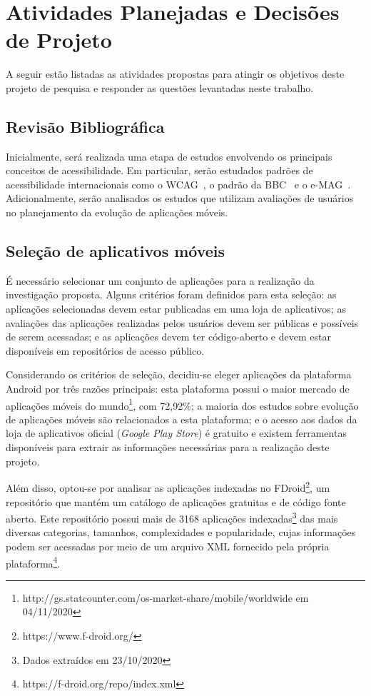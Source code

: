 \section{Atividades Planejadas e Decisões de Projeto}
\label{sec:atividadesgerais}

A seguir estão listadas as atividades propostas para atingir os objetivos deste projeto de pesquisa e responder as questões levantadas neste trabalho.

\subsection{Revisão Bibliográfica}

Inicialmente, será realizada uma etapa de estudos envolvendo os principais conceitos de acessibilidade. Em particular, serão estudados padrões de acessibilidade internacionais como o WCAG~\cite{wcag}, o padrão da BBC~\cite{bbc} e o e-MAG~\cite{emag}. Adicionalmente, serão analisados os estudos que utilizam avaliações de usuários no planejamento da evolução de aplicações móveis.

\subsection{Seleção de aplicativos móveis}
\label{sec:selecaoapps}

É necessário selecionar um conjunto de aplicações para a realização da investigação proposta. Alguns critérios foram definidos para esta seleção: as aplicações selecionadas devem estar publicadas em uma loja de aplicativos; as avaliações das aplicações realizadas pelos usuários devem ser públicas e possíveis de serem acessadas; e as aplicações devem ter código-aberto e devem estar disponíveis em repositórios de acesso público.

Considerando os critérios de seleção, decidiu-se eleger aplicações da plataforma Android por três razões principais: 
esta plataforma possui o maior mercado de aplicações móveis do mundo\footnote{http://gs.statcounter.com/os-market-share/mobile/worldwide em 04/11/2020}, com 72,92\%;
a maioria dos estudos sobre evolução de aplicações móveis são relacionados a esta plataforma; 
e o acesso aos dados da loja de aplicativos oficial (\textit{Google Play Store}) é gratuito e existem ferramentas disponíveis para extrair as informações necessárias para a realização deste projeto.

Além disso, optou-se por analisar as aplicações indexadas no FDroid\footnote{https://www.f-droid.org/}, um repositório que mantém um catálogo de aplicações gratuitas e de código fonte aberto. Este repositório possui mais de 3168 aplicações indexadas\footnote{Dados extraídos em 23/10/2020} das mais diversas categorias, tamanhos, complexidades e popularidade, cujas informações podem ser acessadas por meio de um arquivo XML fornecido pela própria plataforma\footnote{https://f-droid.org/repo/index.xml}.

